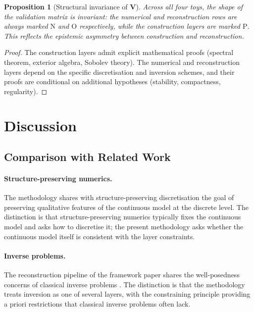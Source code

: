 \documentclass[11pt,a4paper]{article}
\theoremstyle{definition}
\theoremstyle{plain}
\newtheorem{proposition}[definition]{Proposition}
\newcommand{\Vmat}{\mathbf{V}}
\newcommand{\Pmark}{\mathrm{P}}
\newcommand{\Nmark}{\mathrm{N}}
\newcommand{\Omark}{\mathrm{O}}
\begin{document}
\begin{proposition}[Structural invariance of $\Vmat$]\label{prop:structural-invariance}
Across all four toys, the shape of the validation matrix is
invariant: the numerical and reconstruction rows are always marked
$\Nmark$ and $\Omark$ respectively, while the construction layers
are marked $\Pmark$. This reflects the epistemic asymmetry between
construction and reconstruction.
\end{proposition}

\begin{proof}
The construction layers admit explicit mathematical proofs
(spectral theorem, exterior algebra, Sobolev theory). The numerical
and reconstruction layers depend on the specific discretisation and
inversion schemes, and their proofs are conditional on additional
hypotheses (stability, compactness, regularity).
\end{proof}

\section{Discussion}
\label{sec:discussion}

\subsection{Comparison with Related Work}

\paragraph{Structure-preserving numerics.}
The methodology shares with structure-preserving discretisation
\cite{hairer-structure} the goal of preserving qualitative
features of the continuous model at the discrete level. The
distinction is that structure-preserving numerics typically fixes
the continuous model and asks how to discretise it; the present
methodology asks whether the continuous model itself is consistent
with the layer constraints.

\paragraph{Inverse problems.}
The reconstruction pipeline of the framework paper shares the
well-posedness concerns of classical inverse problems
\cite{engl}. The distinction is that the methodology treats
inversion as one of several layers, with the constraining principle
providing a priori restrictions that classical inverse problems
often lack.
\end{document}
